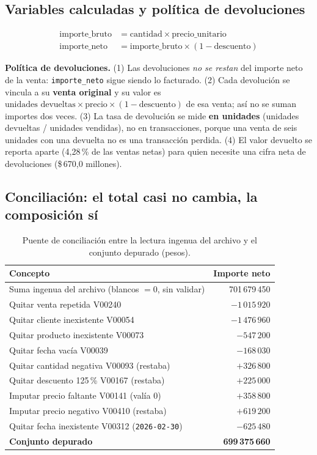 \documentclass[11pt,letterpaper]{article}
\newcommand{\cop}[1]{\$\,#1}
\begin{document}
\subsection{Variables calculadas y política de devoluciones}

\begin{align*}
\text{importe\_bruto} &= \text{cantidad} \times \text{precio\_unitario}\\
\text{importe\_neto} &= \text{importe\_bruto} \times (1-\text{descuento})
\end{align*}

\textbf{Política de devoluciones.}
(1) Las devoluciones \emph{no se restan} del importe neto de la venta: \texttt{importe\_neto} sigue siendo lo
facturado. (2) Cada devolución se vincula a su \textbf{venta original} y su valor es
$\text{unidades devueltas}\times\text{precio}\times(1-\text{descuento})$ de esa venta; así no se suman importes dos
veces. (3) La tasa de devolución se mide \textbf{en unidades} (unidades devueltas / unidades vendidas), no en
transacciones, porque una venta de seis unidades con una devuelta no es una transacción perdida. (4) El valor
devuelto se reporta aparte (4,28\,\% de las ventas netas) para quien necesite una cifra neta de devoluciones
(\cop{670,0} millones).

\subsection{Conciliación: el total casi no cambia, la composición sí}

\begin{table}[H]
\centering
\caption{Puente de conciliación entre la lectura ingenua del archivo y el conjunto depurado (pesos).}
\begin{tabularx}{\linewidth}{L r}
\toprule
Concepto & Importe neto \\
\midrule
Suma ingenua del archivo (blancos $=0$, sin validar) & 701\,679\,450 \\
Quitar venta repetida V00240 & $-1\,015\,920$ \\
Quitar cliente inexistente V00054 & $-1\,476\,960$ \\
Quitar producto inexistente V00073 & $-547\,200$ \\
Quitar fecha vacía V00039 & $-168\,030$ \\
Quitar cantidad negativa V00093 (restaba) & $+326\,800$ \\
Quitar descuento 125\,\% V00167 (restaba) & $+225\,000$ \\
Imputar precio faltante V00141 (valía 0) & $+358\,800$ \\
Imputar precio negativo V00410 (restaba) & $+619\,200$ \\
Quitar fecha inexistente V00312 (\texttt{2026-02-30}) & $-625\,480$ \\
\midrule
\textbf{Conjunto depurado} & \textbf{699\,375\,660} \\
\bottomrule
\end{tabularx}
\end{table}
\end{document}
